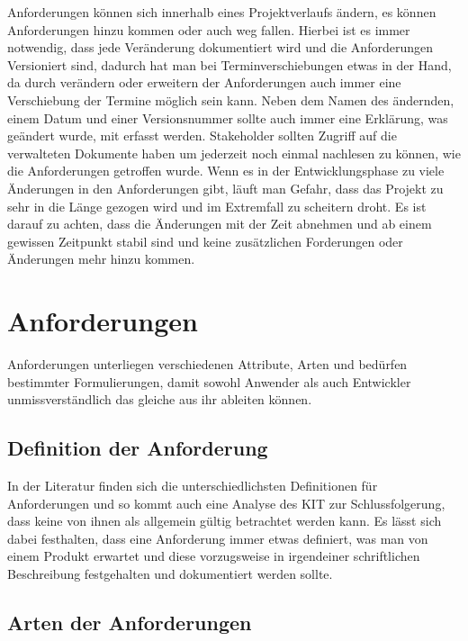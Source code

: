 \begin{itemize}
		Anforderungen können sich innerhalb eines Projektverlaufs ändern, es können Anforderungen hinzu
		kommen oder auch weg fallen. Hierbei ist es immer notwendig, dass jede Veränderung dokumentiert 
		wird und die Anforderungen Versioniert sind, dadurch hat man bei Terminverschiebungen etwas in 
		der Hand, da durch verändern oder erweitern der Anforderungen auch immer eine Verschiebung der 
		Termine möglich sein kann. Neben dem Namen des ändernden, einem Datum und einer Versionsnummer 
		sollte auch immer eine Erklärung, was geändert wurde, mit erfasst werden. Stakeholder sollten 
		Zugriff auf die verwalteten Dokumente haben um jederzeit noch einmal nachlesen zu können, wie 
		die	Anforderungen getroffen wurde. Wenn es in der Entwicklungsphase zu viele Änderungen in den
		Anforderungen gibt, läuft man Gefahr, dass das Projekt zu sehr in die Länge gezogen wird und im
		Extremfall zu scheitern droht. Es ist darauf zu achten, dass die Änderungen mit der Zeit abnehmen
		und ab einem gewissen Zeitpunkt stabil sind und keine zusätzlichen Forderungen oder Änderungen mehr 
		hinzu kommen.
		
\end{itemize}

\section{Anforderungen}

Anforderungen unterliegen verschiedenen Attribute, Arten und bedürfen bestimmter Formulierungen, damit sowohl Anwender als auch Entwickler unmissverständlich das gleiche aus ihr ableiten können.

\subsection{Definition der Anforderung}

In der Literatur finden sich die unterschiedlichsten Definitionen für Anforderungen und so kommt auch eine Analyse des KIT zur Schlussfolgerung, dass keine von ihnen als allgemein gültig betrachtet werden kann\autocite[9][2.3.1]{KPAvMdAM}. Es lässt sich dabei festhalten, dass eine Anforderung immer etwas definiert, was man von einem Produkt erwartet und diese vorzugsweise in irgendeiner schriftlichen Beschreibung festgehalten und dokumentiert werden sollte.

\subsection{Arten der Anforderungen}

